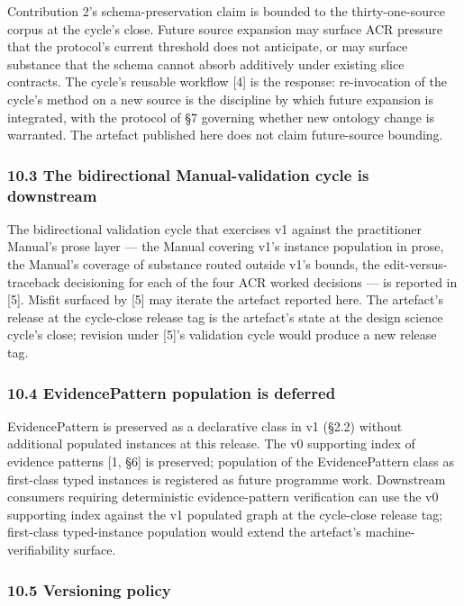 \documentclass[
]{article}
\begin{document}
Contribution 2's schema-preservation claim is bounded to the
thirty-one-source corpus at the cycle's close. Future source expansion
may surface ACR pressure that the protocol's current threshold does not
anticipate, or may surface substance that the schema cannot absorb
additively under existing slice contracts. The cycle's reusable workflow
{[}4{]} is the response: re-invocation of the cycle's method on a new
source is the discipline by which future expansion is integrated, with
the protocol of §7 governing whether new ontology change is warranted.
The artefact published here does not claim future-source bounding.

\subsubsection{10.3 The bidirectional Manual-validation cycle is
downstream}\label{the-bidirectional-manual-validation-cycle-is-downstream}

The bidirectional validation cycle that exercises v1 against the
practitioner Manual's prose layer --- the Manual covering v1's instance
population in prose, the Manual's coverage of substance routed outside
v1's bounds, the edit-versus-traceback decisioning for each of the four
ACR worked decisions --- is reported in {[}5{]}. Misfit surfaced by
{[}5{]} may iterate the artefact reported here. The artefact's release
at the cycle-close release tag is the artefact's state at the design
science cycle's close; revision under {[}5{]}'s validation cycle would
produce a new release tag.

\subsubsection{10.4 EvidencePattern population is
deferred}\label{evidencepattern-population-is-deferred}

EvidencePattern is preserved as a declarative class in v1 (§2.2) without
additional populated instances at this release. The v0 supporting index
of evidence patterns {[}1, §6{]} is preserved; population of the
EvidencePattern class as first-class typed instances is registered as
future programme work. Downstream consumers requiring deterministic
evidence-pattern verification can use the v0 supporting index against
the v1 populated graph at the cycle-close release tag; first-class
typed-instance population would extend the artefact's
machine-verifiability surface.

\subsubsection{10.5 Versioning policy}\label{versioning-policy}
\end{document}
